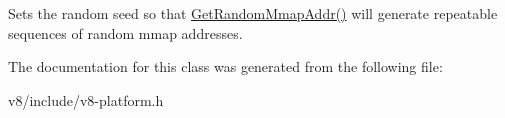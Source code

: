 Sets the random seed so that \mbox{\hyperlink{classv8_1_1PageAllocator_a37f194f9c5fdbe5105476cbd1432418c}{Get\+Random\+Mmap\+Addr()}} will generate repeatable sequences of random mmap addresses. 

The documentation for this class was generated from the following file\+:\begin{DoxyCompactItemize}
\item 
v8/include/v8-\/platform.\+h\end{DoxyCompactItemize}
